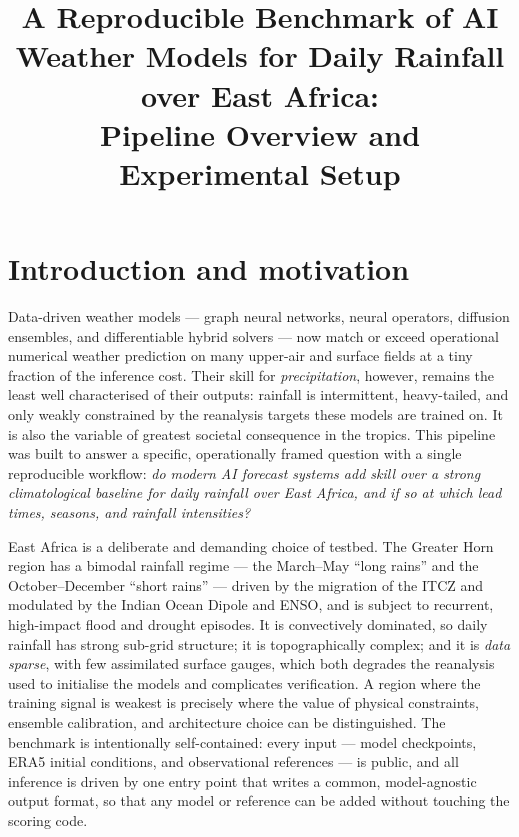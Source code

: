 \documentclass[11pt]{article}
\title{\vspace{-1.5em}A Reproducible Benchmark of AI Weather Models for
Daily Rainfall over East Africa:\\ Pipeline Overview and Experimental Setup}
\author{}
\date{}
\begin{document}
\maketitle
\vspace{-3em}

\section{Introduction and motivation}

Data-driven weather models --- graph neural networks, neural operators,
diffusion ensembles, and differentiable hybrid solvers --- now match or exceed
operational numerical weather prediction on many upper-air and surface fields at
a tiny fraction of the inference cost. Their skill for \emph{precipitation},
however, remains the least well characterised of their outputs: rainfall is
intermittent, heavy-tailed, and only weakly constrained by the reanalysis
targets these models are trained on. It is also the variable of greatest
societal consequence in the tropics. This pipeline was built to answer a
specific, operationally framed question with a single reproducible workflow:
\emph{do modern AI forecast systems add skill over a strong climatological
baseline for daily rainfall over East Africa, and if so at which lead times,
seasons, and rainfall intensities?}

East Africa is a deliberate and demanding choice of testbed. The Greater Horn
region has a bimodal rainfall regime --- the March--May ``long rains'' and the
October--December ``short rains'' --- driven by the migration of the ITCZ and
modulated by the Indian Ocean Dipole and ENSO, and is subject to recurrent,
high-impact flood and drought episodes. It is convectively dominated, so daily
rainfall has strong sub-grid structure; it is topographically complex; and it is
\emph{data sparse}, with few assimilated surface gauges, which both degrades the
reanalysis used to initialise the models and complicates verification. A region
where the training signal is weakest is precisely where the value of physical
constraints, ensemble calibration, and architecture choice can be
distinguished. The benchmark is intentionally self-contained: every input ---
model checkpoints, ERA5 initial conditions, and observational references --- is
public, and all inference is driven by one entry point that writes a common,
model-agnostic output format, so that any model or reference can be added
without touching the scoring code.
\end{document}
